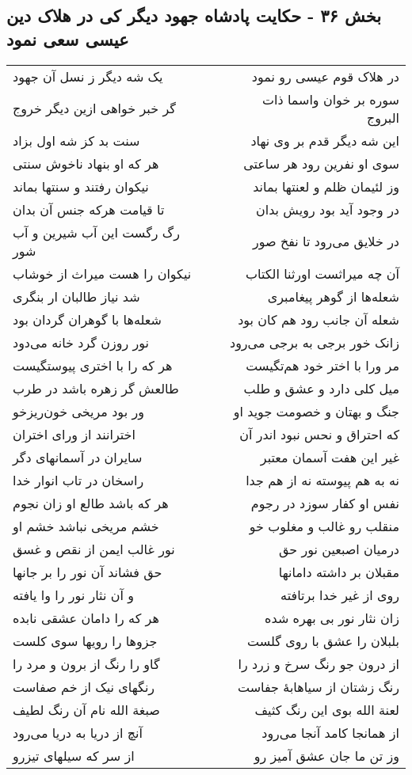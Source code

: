 \begin{center}
\section*{بخش ۳۶ - حکایت پادشاه جهود دیگر کی در هلاک دین عیسی سعی نمود}
\label{sec:sh036}
\begin{longtable}{l p{0.5cm} r}
یک شه دیگر ز نسل آن جهود
&&
در هلاک قوم عیسی رو نمود
\\
گر خبر خواهی ازین دیگر خروج
&&
سوره بر خوان واسما ذات البروج
\\
سنت بد کز شه اول بزاد
&&
این شه دیگر قدم بر وی نهاد
\\
هر که او بنهاد ناخوش سنتی
&&
سوی او نفرین رود هر ساعتی
\\
نیکوان رفتند و سنتها بماند
&&
وز لئیمان ظلم و لعنتها بماند
\\
تا قیامت هرکه جنس آن بدان
&&
در وجود آید بود رویش بدان
\\
رگ رگست این آب شیرین و آب شور
&&
در خلایق می‌رود تا نفخ صور
\\
نیکوان را هست میراث از خوشاب
&&
آن چه میراثست اورثنا الکتاب
\\
شد نیاز طالبان ار بنگری
&&
شعله‌ها از گوهر پیغامبری
\\
شعله‌ها با گوهران گردان بود
&&
شعله آن جانب رود هم کان بود
\\
نور روزن گرد خانه می‌دود
&&
زانک خور برجی به برجی می‌رود
\\
هر که را با اختری پیوستگیست
&&
مر ورا با اختر خود هم‌تگیست
\\
طالعش گر زهره باشد در طرب
&&
میل کلی دارد و عشق و طلب
\\
ور بود مریخی خون‌ریزخو
&&
جنگ و بهتان و خصومت جوید او
\\
اخترانند از ورای اختران
&&
که احتراق و نحس نبود اندر آن
\\
سایران در آسمانهای دگر
&&
غیر این هفت آسمان معتبر
\\
راسخان در تاب انوار خدا
&&
نه به هم پیوسته نه از هم جدا
\\
هر که باشد طالع او زان نجوم
&&
نفس او کفار سوزد در رجوم
\\
خشم مریخی نباشد خشم او
&&
منقلب رو غالب و مغلوب خو
\\
نور غالب ایمن از نقص و غسق
&&
درمیان اصبعین نور حق
\\
حق فشاند آن نور را بر جانها
&&
مقبلان بر داشته دامانها
\\
و آن نثار نور را وا یافته
&&
روی از غیر خدا برتافته
\\
هر که را دامان عشقی نابده
&&
زان نثار نور بی بهره شده
\\
جزوها را رویها سوی کلست
&&
بلبلان را عشق با روی گلست
\\
گاو را رنگ از برون و مرد را
&&
از درون جو رنگ سرخ و زرد را
\\
رنگهای نیک از خم صفاست
&&
رنگ زشتان از سیاهابهٔ جفاست
\\
صبغة الله نام آن رنگ لطیف
&&
لعنة الله بوی این رنگ کثیف
\\
آنچ از دریا به دریا می‌رود
&&
از همانجا کامد آنجا می‌رود
\\
از سر که سیلهای تیزرو
&&
وز تن ما جان عشق آمیز رو
\\
\end{longtable}
\end{center}
